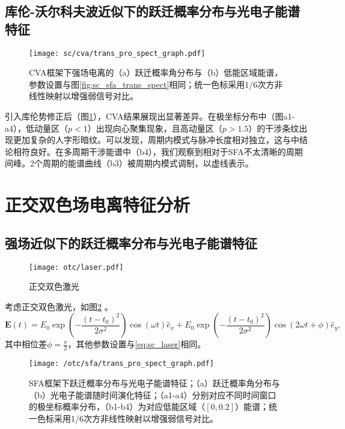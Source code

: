 \subsection{库伦-沃尔科夫波近似下的跃迁概率分布与光电子能谱特征}

\begin{figure}[!htpb]  %
	\centering
	\texttt{[image: sc/cva/trans\_pro\_spect\_graph.pdf]}
	\caption{CVA框架下强场电离的（a）跃迁概率角分布与（b）低能区域能谱，参数设置与图\ref{fig:sc_sfa_trans_spect}相同；统一色标采用1/6次方非线性映射以增强弱信号对比。}
	\label{fig:sc_cva_trans_spect}
\end{figure}

引入库伦势修正后（图\ref{fig:sc_cva_trans_spect}），CVA结果展现出显著差异。在极坐标分布中（图a1-a4），低动量区（$p<1$）出现向心聚集现象，且高动量区（$p>1.5$）的干涉条纹出现更加复杂的人字形暗纹。可以发现，周期内模式与脉冲长度相对独立，这与中结论相符良好。在多周期干涉能谱中（b4），我们观察到相对于SFA不太清晰的周期间峰。2个周期的能谱曲线（b3）被周期内模式调制，以虚线表示。

%
\section{正交双色场电离特征分析}
\subsection{强场近似下的跃迁概率分布与光电子能谱特征}

\begin{figure}[!htpb]  %
	\centering
	\texttt{[image: otc/laser.pdf]}
	\caption{正交双色激光}
	\label{fig:otc_laser}
\end{figure}

考虑正交双色激光，如图\ref{fig:otc_laser} 。
\begin{equation}
\mathbf{E}(t) = E_0 \exp\left(-\frac{(t - t_0)^2}{2\sigma^2}\right) \cos(\omega t) \hat e_x + E_0 \exp\left(-\frac{(t - t_0)^2}{2\sigma^2}\right) \cos(2 \omega t + \phi) \hat e_y,
\label{eq:otc_laser}
\end{equation}
其中相位差$\phi = \frac{\pi}{2}$，其他参数设置与\ref{eq:sc_laser}相同。

\begin{figure}[!htpb]  %
	\centering
	\texttt{[image: /otc/sfa/trans\_pro\_spect\_graph.pdf]}
	\caption{SFA框架下跃迁概率分布与光电子能谱特征；（a）跃迁概率角分布与（b）光电子能谱随时间演化特征；（a1-a4）分别对应不同时间窗口的极坐标概率分布，（b1-b4）为对应低能区域（$[0, 0.2]$）能谱；统一色标采用1/6次方非线性映射以增强弱信号对比。}
	\label{fig:otc_sfa_trans_spect}
\end{figure}

